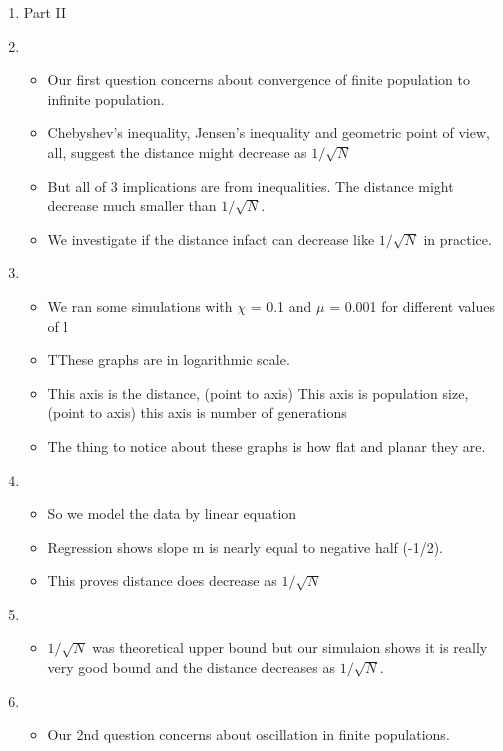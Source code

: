 \documentclass{article}
\begin{document}
\begin{enumerate}
\item {Part II}
  
\item
  \begin{itemize}
  \item Our first question concerns about convergence of finite population to infinite population.
  \item Chebyshev's inequality, Jensen's inequality and geometric point of view, all, suggest the distance might decrease
    as $1/\sqrt{ N}$
  \item But all of 3 implications are from inequalities. The distance
    might decrease much smaller than $1/\sqrt{ N}$.
  \item We investigate if the distance infact can decrease like $1/\sqrt{N}$ in practice. 
  \end{itemize}
  
\item
  \begin{itemize}
  \item We ran some simulations with $\chi$ = 0.1 and $\mu$ = 0.001 for
    different values of l
  \item TThese graphs are in logarithmic scale.
  \item  This axis is the distance, (point to axis) This axis is population size, (point to axis) this axis is number of generations
  \item The thing to notice about these graphs is how flat and planar they are. 
  \end{itemize}
    
\item
  \begin{itemize}
  \item So we model the data by linear equation
  \item Regression shows slope m is nearly equal to negative half (-1/2).
  \item This proves distance does decrease as $1/\sqrt{N}$  
  \end{itemize}

\item
  \begin{itemize}
  \item $1/\sqrt{N}$ was theoretical upper bound 
  but our simulaion shows it is really very good bound 
  and the distance decreases as $1/\sqrt{N}$. 
  \end{itemize}
    
\item 
  \begin{itemize}
  \item Our 2nd question concerns about oscillation in
    finite populations.
  \end{itemize}
    

\end{enumerate}
\end{document}
